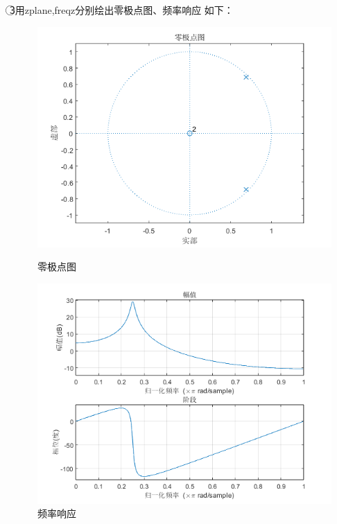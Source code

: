 \documentclass[10pt]{article}
\begin{document}
\textcircled{3}用zplane,freqz分别绘出零极点图、频率响应
如下：
\begin{figure}[htbp]
	\centering
	\begin{minipage}{0.49\linewidth}
		\centering
		\includegraphics[width=0.9\linewidth]{drawing1-1.png}
		\caption{零极点图}
	\end{minipage}
	\begin{minipage}{0.49\linewidth}
		\centering
		\includegraphics[width=0.9\linewidth]{drawing1-2.png}
		\caption{频率响应}
	\end{minipage}
\end{figure}
\end{document}
